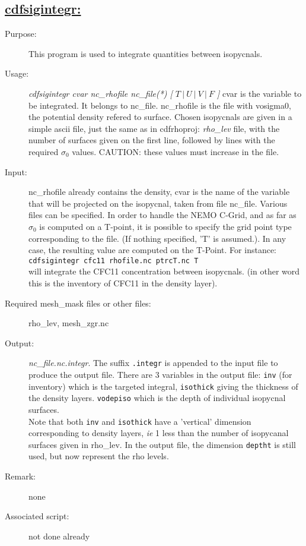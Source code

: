 \documentclass[a4paper,11pt]{article}
\begin{document}
\subsection*{\underline{cdfsigintegr:}}
\begin{description}
\item[Purpose:]  This program is used to integrate quantities between isopycnals.
\item[Usage:] {\em cdfsigintegr cvar nc\_rhofile nc\_file(*) [ $T~|~U~|~V~|~F$ ] }
  cvar is the variable to be integrated. It belongs to nc\_file. nc\_rhofile is the file with vosigma0, the potential density refered to surface.
Chosen isopycnals are given in a simple ascii file, just the same as in cdfrhoproj:
{\em rho\_lev} file, with the number of surfaces given on the
first line, followed by lines with the required $\sigma_0$ values. CAUTION: these values must increase in the file.

\item[Input:]  nc\_rhofile already contains the density, cvar is the name of the variable that will be projected on the isopycnal, taken from file
nc\_file. Various files can be specified. In order to handle the NEMO C-Grid, and as far as $\sigma_0$ is computed on a T-point, it is possible
to specify the grid point type corresponding to the file. (If nothing specified, 'T' is assumed.). In any case, the resulting value are computed
on the T-Point. 
For instance:\\
 {\tt cdfsigintegr cfc11 rhofile.nc ptrcT.nc T }\\
will integrate the CFC11 concentration between isopycnals. (in other word this is the inventory of CFC11 in the density layer).
\item[Required mesh\_mask files or other files:]  rho\_lev, mesh\_zgr.nc
\item[Output:] {\em nc\_file.nc.integr}. The suffix {\tt .integr} is appended to the input file to produce the output file. 
There are 3 variables in the output file: {\tt inv} (for inventory) which is the targeted integral, {\tt isothick} giving the thickness of the
density layers. {\tt vodepiso} which is the depth of individual isopycnal surfaces.\\
Note that  both {\tt inv} and {\tt isothick} have a 'vertical' dimension corresponding to density layers, {\it ie} 1 less than the number of isopycanal
surfaces given in rho\_lev.
In the output file, the dimension {\tt deptht} is still used, but now represent the rho levels.
\item[Remark:]  none
\item[Associated script:] not done already
\end{description}
\end{document}
